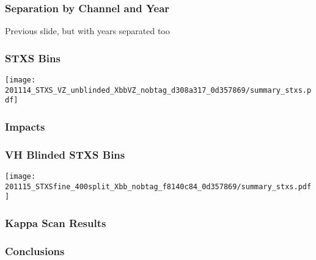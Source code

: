 \documentclass{beamer}
\newcommand{\beginbackup}{
  \newcounter{framenumbervorappendix}
  \setcounter{framenumbervorappendix}{\value{framenumber}}
}
\newcommand{\backupend}{
  \addtocounter{framenumbervorappendix}{-\value{framenumber}}
  \addtocounter{framenumber}{\value{framenumbervorappendix}}
}
\begin{document}
\begin{frame}
  \frametitle{Separation by Channel and Year}

  Previous slide, but with years separated too

\end{frame}

\begin{frame}
  \frametitle{STXS Bins}

  \centering
  \texttt{[image: 201114\_STXS\_VZ\_unblinded\_XbbVZ\_nobtag\_d308a317\_0d357869/summary\_stxs.pdf]}

\end{frame}

\begin{frame}
  \frametitle{Impacts}

\end{frame}

\begin{frame}
  \frametitle{VH Blinded STXS Bins}

  \centering
  \texttt{[image: 201115\_STXSfine\_400split\_Xbb\_nobtag\_f8140c84\_0d357869/summary\_stxs.pdf]}

\end{frame}

\begin{frame}
  \frametitle{Kappa Scan Results}

\end{frame}

\begin{frame}
  \frametitle{Conclusions}

\end{frame}

\begin{comment}
\beginbackup

\begin{frame}
  \centering
    {\Huge \bf\sffamily Backup Slides}
\end{frame}



\backupend
\end{comment}
\end{document}
